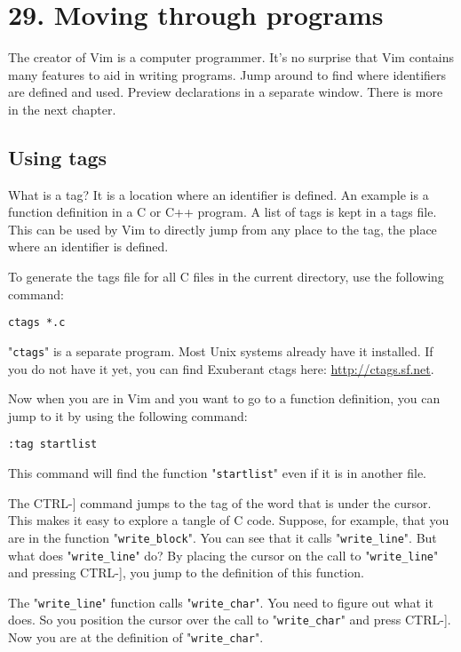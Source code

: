 \section{29. Moving through programs}
The creator of Vim is a computer programmer.
It's no surprise that Vim contains many features to aid in writing programs.
Jump around to find where identifiers are defined and used.
Preview declarations in a separate window.
There is more in the next chapter.
\subsection{Using tags}
\label{Using tags}
What is a tag?  It is a location where an identifier is defined.
An example is a function definition in a C or C++ program.
A list of tags is kept in a tags file.
This can be used by Vim to directly jump from any place to the tag, the place where an identifier is defined.

To generate the tags file for all C files in the current directory, use the following command:

\begin{Verbatim}[samepage=true]
 ctags *.c
\end{Verbatim}

"\texttt{ctags}" is a separate program.
Most Unix systems already have it installed.
If you do not have it yet, you can find Exuberant ctags here: \url{http://ctags.sf.net}.

Now when you are in Vim and you want to go to a function definition, you can jump to it by using the following command:

\begin{Verbatim}[samepage=true]
 :tag startlist
\end{Verbatim}

This command will find the function "\texttt{startlist}" even if it is in another file.

The CTRL-] command jumps to the tag of the word that is under the cursor.
This makes it easy to explore a tangle of C code.
Suppose, for example, that you are in the function "\texttt{write\_block}".
You can see that it calls "\texttt{write\_line}".
But what does "\texttt{write\_line}" do?  By placing the cursor on the call to "\texttt{write\_line}" and pressing CTRL-], you jump to the definition of this function.

The "\texttt{write\_line}" function calls "\texttt{write\_char}".
You need to figure out what it does.
So you position the cursor over the call to "\texttt{write\_char}" and press CTRL-].
Now you are at the definition of "\texttt{write\_char}".

